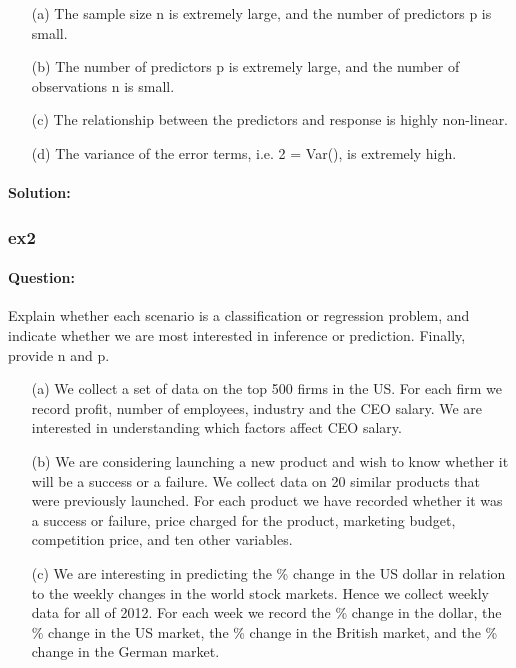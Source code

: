 \documentclass[a4paper,12pt,titlepage]{article} %
\begin{document}
\begin{itemize}
	\item[(a)] The sample size n is extremely large, and the number of predictors p is small.
	\item[(b)] The number of predictors p is extremely large, and the number of observations n is small.
	\item[(c)] The relationship between the predictors and response is highly non-linear.
	\item[(d)] The variance of the error terms, i.e. 2 = Var(), is extremely high.
\end{itemize}

\paragraph{Solution:}

\subsubsection{ex2}
\paragraph{Question:} Explain whether each scenario is a classification or regression problem, and indicate whether we are most interested in inference or prediction. Finally, provide n and p.

\begin{itemize}
	\item[(a)] We collect a set of data on the top 500 firms in the US. For each firm we record profit, number of employees, industry and the CEO salary. We are interested in understanding which factors affect CEO salary.
	\item[(b)] We are considering launching a new product and wish to know whether it will be a success or a failure. We collect data on 20 similar products that were previously launched. For each product we have recorded whether it was a success or failure, price charged for the product, marketing budget, competition price, and ten other variables.
	\item[(c)] We are interesting in predicting the \% change in the US dollar in relation to the weekly changes in the world stock markets. Hence we collect weekly data for all of 2012. For each week we record the \% change in the dollar, the \% change in the US market, the \% change in the British market, and the \% change in the German market.
\end{itemize}
\end{document}
